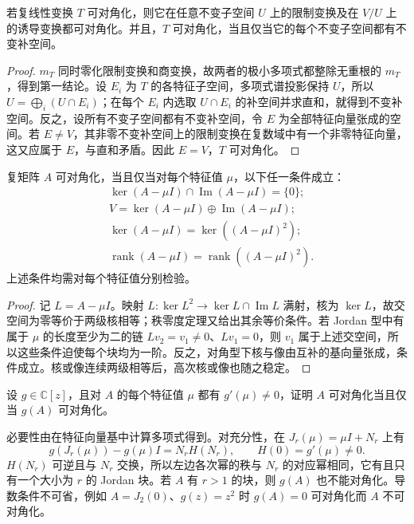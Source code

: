 \begin{proposition}[限制、商空间与不变补空间]
\label{prop:xie-ex-sim-complement}
若复线性变换 $T$ 可对角化，则它在任意不变子空间 $U$ 上的限制变换及在 $V/U$ 上的诱导变换都可对角化。并且，$T$ 可对角化，当且仅当它的每个不变子空间都有不变补空间。
\end{proposition}
\begin{proof}
$m_T$ 同时零化限制变换和商变换，故两者的极小多项式都整除无重根的 $m_T$，得到第一结论。设 $E_i$ 为 $T$ 的各特征子空间，多项式谱投影保持 $U$，所以 $U=\bigoplus_i(U\cap E_i)$；在每个 $E_i$ 内选取 $U\cap E_i$ 的补空间并求直和，就得到不变补空间。反之，设所有不变子空间都有不变补空间，令 $E$ 为全部特征向量张成的空间。若 $E\ne V$，其非零不变补空间上的限制变换在复数域中有一个非零特征向量，这又应属于 $E$，与直和矛盾。因此 $E=V$，$T$ 可对角化。
\end{proof}

\begin{proposition}[核、像与秩的判据]
\label{prop:xie-ex-sim-kernel-criterion}
复矩阵 $A$ 可对角化，当且仅当对每个特征值 $\mu$，以下任一条件成立：
\begin{align*}
 &\ker(A-\mu I)\cap\operatorname{Im}(A-\mu I)=\{0\};\\
 &V=\ker(A-\mu I)\oplus\operatorname{Im}(A-\mu I);\\
 &\ker(A-\mu I)=\ker((A-\mu I)^2);\\
 &\operatorname{rank}(A-\mu I)=\operatorname{rank}((A-\mu I)^2).
\end{align*}
上述条件均需对每个特征值分别检验。
\end{proposition}
\begin{proof}
记 $L=A-\mu I$。映射 $L:\ker L^2\to\ker L\cap\operatorname{Im}L$ 满射，核为 $\ker L$，故交空间为零等价于两级核相等；秩零度定理又给出其余等价条件。若 Jordan 型中有属于 $\mu$ 的长度至少为二的链 $Lv_2=v_1\ne0$、$Lv_1=0$，则 $v_1$ 属于上述交空间，所以这些条件迫使每个块均为一阶。反之，对角型下核与像由互补的基向量张成，条件成立。核或像连续两级相等后，高次核或像也随之稳定。
\end{proof}

\begin{example}
设 $g\in\mathbb C[z]$，且对 $A$ 的每个特征值 $\mu$ 都有 $g'(\mu)\ne0$，证明 $A$ 可对角化当且仅当 $g(A)$ 可对角化。
\end{example}
\begin{solve}
必要性由在特征向量基中计算多项式得到。对充分性，在 $J_r(\mu)=\mu I+N_r$ 上有
\[
 g(J_r(\mu))-g(\mu)I=N_rH(N_r),\qquad H(0)=g'(\mu)\ne0.
\]
$H(N_r)$ 可逆且与 $N_r$ 交换，所以左边各次幂的秩与 $N_r$ 的对应幂相同，它有且只有一个大小为 $r$ 的 Jordan 块。若 $A$ 有 $r>1$ 的块，则 $g(A)$ 也不能对角化。导数条件不可省，例如 $A=J_2(0)$、$g(z)=z^2$ 时 $g(A)=0$ 可对角化而 $A$ 不可对角化。
\end{solve}


